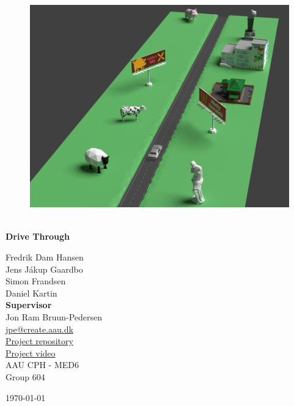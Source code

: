 \begin{titlepage}
			
\addtolength{\voffset}{2cm}

\begin{figure}[H]
\centering
\vspace{2cm}	%
\includegraphics[width=1\linewidth]{figure/Implementation/Overloaded.png}
\end{figure}

\mbox{}
\vfill
\renewcommand{\familydefault}{\sfdefault} \normalfont %
\HRule\\[0.1cm]
\textbf{{{\Huge Drive Through}}} \hspace{0.15cm}\\
\HRule\smallskip{}
\begin{multicols}{2}
{\Large Fredrik Dam Hansen\\Jens Jákup Gaardbo\\Simon Frandsen\\Daniel Kartin\columnbreak}\\
\setlength{\parskip}{2.4cm}
{\Large{\textbf{Supervisor}\\Jon Ram Bruun-Pedersen\\\href{mailto:jpe@create.aau.dk}{\color{blue}jpe@create.aau.dk}}}\medskip\\
\href{https://github.com/roadmandam/medialogyp6}{\color{blue}Project repository}\\
\href{https://www.youtube.com/watch?v=Rl-HKPNP9ZY}{\color{blue}Project video}\medskip
\\\small AAU CPH - 
MED6 \\
Group 604\\
\end{multicols}
\today
\renewcommand{\familydefault}{\rmdefault} \normalfont %
\end{titlepage}


